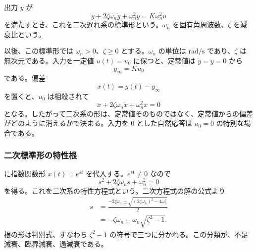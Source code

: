 \begin{definition}[二次遅れの標準形]
出力 $y$ が
\begin{equation}
  \ddot{y}+2\zeta\omega_n\dot{y}+\omega_n^2 y=K\omega_n^2 u
  \label{eq:second-order}
\end{equation}
を満たすとき、これを二次遅れ系の標準形という。$\omega_n$ を固有角周波数、$\zeta$ を減衰比という。
\end{definition}

以後、この標準形では $\omega_n>0$、$\zeta\ge0$ とする。$\omega_n$ の単位は $\mathrm{rad/s}$ であり、$\zeta$ は無次元である。入力を一定値 $u(t)=u_0$ に保つと、定常値は $\dot{y}=\ddot{y}=0$ から
\begin{equation}
  y_\infty=K u_0
\end{equation}
である。偏差
\begin{equation}
  x(t)=y(t)-y_\infty
\end{equation}
を置くと、$u_0$ は相殺されて
\begin{equation}
  \ddot{x}+2\zeta\omega_n\dot{x}+\omega_n^2x=0
  \label{eq:second-order-deviation}
\end{equation}
となる。したがって二次系の形は、定常値そのものではなく、定常値からの偏差がどのように消えるかで決まる。入力を 0 とした自然応答は $u_0=0$ の特別な場合である。

\subsubsection{二次標準形の特性根}

 に指数関数形 $x(t)=e^{st}$ を代入する。$e^{st}\ne0$ なので
\begin{equation}
  s^2+2\zeta\omega_n s+\omega_n^2=0
\end{equation}
を得る。これを二次系の特性方程式という。二次方程式の解の公式より
\begin{align}
  s&=\frac{-2\zeta\omega_n\pm
  \sqrt{(2\zeta\omega_n)^2-4\omega_n^2}}{2}\\
  &=-\zeta\omega_n\pm\omega_n\sqrt{\zeta^2-1}.
  \label{eq:second-order-characteristic-roots}
\end{align}
根の形は判別式、すなわち $\zeta^2-1$ の符号で三つに分かれる。この分類が、不足減衰、臨界減衰、過減衰である。

